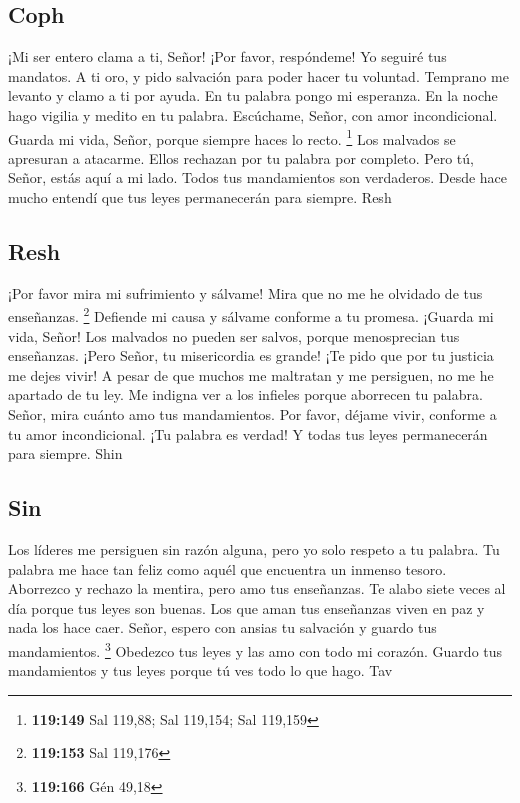 \hypertarget{coph}{%
\subsection{Coph}\label{coph}}

 ¡Mi ser entero clama a ti, Señor! ¡Por favor, respóndeme!
Yo seguiré tus mandatos.  A ti oro, y pido salvación para
poder hacer tu voluntad.  Temprano me levanto y clamo a ti
por ayuda. En tu palabra pongo mi esperanza.  En la noche
hago vigilia y medito en tu palabra.  Escúchame, Señor,
con amor incondicional. Guarda mi vida, Señor, porque siempre haces lo
recto. \footnote{\textbf{119:149} Sal 119,88; Sal 119,154; Sal 119,159}
 Los malvados se apresuran a atacarme. Ellos rechazan por
tu palabra por completo.  Pero tú, Señor, estás aquí a mi
lado. Todos tus mandamientos son verdaderos.  Desde hace
mucho entendí que tus leyes permanecerán para siempre. Resh

\hypertarget{resh}{%
\subsection{Resh}\label{resh}}

 ¡Por favor mira mi sufrimiento y sálvame! Mira que no me
he olvidado de tus enseñanzas. \footnote{\textbf{119:153} Sal 119,176}
 Defiende mi causa y sálvame conforme a tu promesa.
¡Guarda mi vida, Señor!  Los malvados no pueden ser
salvos, porque menosprecian tus enseñanzas.  ¡Pero Señor,
tu misericordia es grande! ¡Te pido que por tu justicia me dejes vivir!
 A pesar de que muchos me maltratan y me persiguen, no me
he apartado de tu ley.  Me indigna ver a los infieles
porque aborrecen tu palabra.  Señor, mira cuánto amo tus
mandamientos. Por favor, déjame vivir, conforme a tu amor incondicional.
 ¡Tu palabra es verdad! Y todas tus leyes permanecerán
para siempre. Shin

\hypertarget{sin}{%
\subsection{Sin}\label{sin}}

 Los líderes me persiguen sin razón alguna, pero yo solo
respeto a tu palabra.  Tu palabra me hace tan feliz como
aquél que encuentra un inmenso tesoro.  Aborrezco y
rechazo la mentira, pero amo tus enseñanzas.  Te alabo
siete veces al día porque tus leyes son buenas.  Los que
aman tus enseñanzas viven en paz y nada los hace caer. 
Señor, espero con ansias tu salvación y guardo tus mandamientos.
\footnote{\textbf{119:166} Gén 49,18}  Obedezco tus leyes
y las amo con todo mi corazón.  Guardo tus mandamientos y
tus leyes porque tú ves todo lo que hago. Tav

